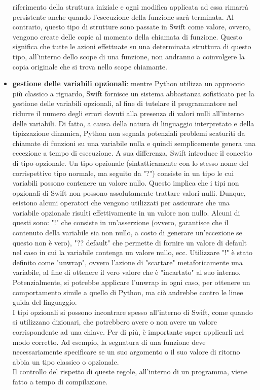\begin{itemize}
    riferimento della struttura iniziale e ogni modifica applicata ad
    essa rimarrà persistente anche quando l'esecuzione della funzione sarà 
   	terminata. Al contrario, questo tipo di strutture sono passate in 
   	Swift come valore, ovvero, vengono create delle copie al momento della
   	chiamata di funzione. Questo significa che tutte le azioni effettuate
   	su una determinata struttura di questo tipo, all'interno dello scope
   	di una funzione, non andranno a coinvolgere la copia originale che
   	si trova nello scope chiamante.
    \item \textbf{gestione delle variabili opzionali}: mentre Python utilizza un
    approccio più classico a riguardo, Swift fornisce un sistema
    abbastanza sofisticato per la gestione delle variabili opzionali,
    al fine di tutelare il programmatore nel ridurre il numero degli errori
    dovuti alla presenza di valori nulli all'interno delle variabili.
    Di fatto, a causa della natura di linguaggio interpretato e della
    tipizzazione dinamica, Python non segnala potenziali problemi scaturiti
    da chiamate di funzioni su una variabile nulla e quindi semplicemente 
    genera una eccezione a tempo di esecuzione. A sua differenza, Swift
    introduce il concetto di tipo opzionale. Un tipo opzionale (sintatticamente
    con lo stesso nome del corrispettivo tipo normale, ma seguito da "?") consiste 
    in un tipo le cui variabili possono contenere un valore nullo. Questo implica
    che i tipi non opzionali di Swift non possono assolutamente trattare 
    valori nulli. Dunque, esistono alcuni operatori che vengono utilizzati
    per assicurare che una variabile opzionale risulti effettivamente in un 
    valore non nullo. Alcuni di questi sono: "!" che consiste in un'asserzione
    (ovvero, garantisce che il contenuto della variabile sia non nullo, a costo 
    di generare un'eccezione se questo non è vero), "?? default" che permette
    di fornire un valore di default nel caso in cui la variabile contenga un 
    valore nullo, ecc. Utilizzare "!" è stato definito come "unwrap", ovvero
    l'azione di "scartare" metaforicamente una variabile, al fine di ottenere
    il vero valore che è "incartato" al suo interno. Potenzialmente, si 
    potrebbe applicare l'unwrap in ogni caso, per ottenere un comportamento 
    simile a quello di Python, ma ciò andrebbe contro le linee guida del
    linguaggio. \\
    I tipi opzionali si possono incontrare spesso all'interno di Swift, come 
    quando si utilizzano dizionari, che potrebbero avere o non avere un valore
    corrispondente ad una chiave. Per di più, è importante saper applicarli
    nel modo corretto. Ad esempio, la segnatura di una funzione deve 
    necessariamente specificare se un suo argomento o il suo valore di 
    ritorno abbia un tipo classico o opzionale.\\
    Il controllo del rispetto di queste regole, all'interno di un programma,
    viene fatto a tempo di compilazione.
    
\end{itemize}


